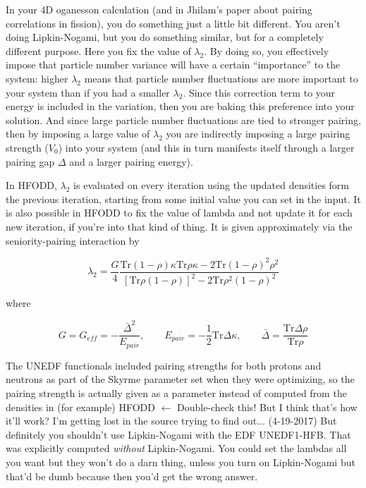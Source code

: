 In your 4D oganesson calculation (and in Jhilam's paper about pairing correlations in fission), you do something just a little bit different. You aren't doing Lipkin-Nogami, but you do something similar, but for a completely different purpose. Here you fix the value of $\lambda_2$. By doing so, you effectively impose that particle number variance will have a certain ``importance'' to the system: higher $\lambda_2$ means that particle number fluctuations are more important to your system than if you had a smaller $\lambda_2$. Since this correction term to your energy is included in the variation, then you are baking this preference into your solution. And since large particle number fluctuations are tied to stronger pairing, then by imposing a large value of $\lambda_2$ you are indirectly imposing a large pairing strength ($V_0$) into your system (and this in turn manifests itself through a larger pairing gap $\Delta$ and a larger pairing energy).

In HFODD, $\lambda_2$ is evaluated on every iteration using the updated densities form the previous iteration, starting from some initial value you can set in the input. It is also possible in HFODD to fix the value of lambda and not update it for each new iteration, if you're into that kind of thing. It is given approximately via the seniority-pairing interaction by

\begin{equation*}
\lambda_2 = \frac{G}{4}\frac{\mathrm{Tr}(1-\rho)\kappa \mathrm{Tr}\rho\kappa-2\mathrm{Tr}(1-\rho)^2\rho^2}{\left[\mathrm{Tr}\rho(1-\rho)\right]^2-2\mathrm{Tr}\rho^2(1-\rho)^2}
\end{equation*}

\noindent where

\begin{equation*}
G = G_{eff} = -\frac{\bar{\Delta}^2}{E_{pair}}, \qquad E_{pair} = -\frac{1}{2}\mathrm{Tr}\Delta\kappa, \qquad \bar{\Delta} = \frac{\mathrm{Tr}\Delta\rho}{\mathrm{Tr}\rho}
\end{equation*}

The UNEDF functionals included pairing strengths for both protons and neutrons as part of the Skyrme parameter set when they were optimizing, so the pairing strength is actually given as a parameter instead of computed from the densities in (for example) HFODD $\leftarrow$ Double-check this! But I think that's how it'll work? I'm getting lost in the source trying to find out... (4-19-2017) But definitely you shouldn't use Lipkin-Nogami with the EDF UNEDF1-HFB. That was explicitly computed \textit{without} Lipkin-Nogami. You could set the lambdas all you want but they won't do a darn thing, unless you turn on Lipkin-Nogami but that'd be dumb because then you'd get the wrong answer.

